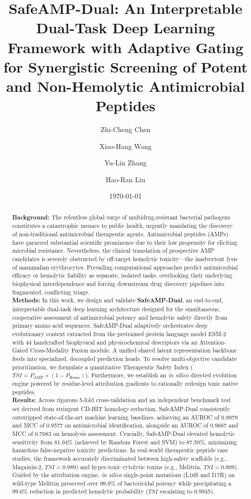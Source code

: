 \documentclass[11pt,a4paper]{article}
\title{\textbf{SafeAMP-Dual: An Interpretable Dual-Task Deep Learning Framework with Adaptive Gating for Synergistic Screening of Potent and Non-Hemolytic Antimicrobial Peptides}}
\author[1]{Zhi-Cheng Chen}
\author[1]{Xiao-Hang Wang}
\author[2]{Yu-Lin Zhang}
\author[1,*]{Hao-Ran Liu}
\affil[1]{Department of Biomedical Engineering, School of Life Sciences, National Center for Computational Biology, Wuhan, 430072, China}
\affil[2]{Institute of Clinical Pharmacology, State Key Laboratory of Biotherapy, West China Hospital, Sichuan University, Chengdu, 610041, China}
\affil[*]{Corresponding author. Email: liu.haoran@computbiol.ac.cn}
\date{\today}
\begin{document}
\maketitle

\begin{abstract}
\textbf{Background:} The relentless global surge of multidrug-resistant bacterial pathogens constitutes a catastrophic menace to public health, urgently mandating the discovery of non-traditional antimicrobial therapeutic agents. Antimicrobial peptides (AMPs) have garnered substantial scientific prominence due to their low propensity for eliciting microbial resistance. Nevertheless, the clinical translation of prospective AMP candidates is severely obstructed by off-target hemolytic toxicity---the inadvertent lysis of mammalian erythrocytes. Prevailing computational approaches predict antimicrobial efficacy or hemolytic liability as separate, isolated tasks, overlooking their underlying biophysical interdependence and forcing downstream drug discovery pipelines into fragmented, conflicting triage. \\
\textbf{Methods:} In this work, we design and validate \textbf{SafeAMP-Dual}, an end-to-end, interpretable dual-task deep learning architecture designed for the simultaneous, cooperative assessment of antimicrobial potency and hemolytic safety directly from primary amino acid sequences. SafeAMP-Dual adaptively orchestrates deep evolutionary context extracted from the pretrained protein language model ESM-2 with 44 handcrafted biophysical and physicochemical descriptors via an Attention-Gated Cross-Modality Fusion module. A unified shared latent representation backbone feeds into specialized, decoupled prediction heads. To resolve multi-objective candidate prioritization, we formulate a quantitative Therapeutic Safety Index ($TSI = P_{\text{AMP}} \times (1 - P_{\text{Hemo}})$). Furthermore, we establish an \textit{in silico} directed evolution engine powered by residue-level attribution gradients to rationally redesign toxic native peptides. \\
\textbf{Results:} Across rigorous 5-fold cross-validation and an independent benchmark test set derived from stringent CD-HIT homology-reduction, SafeAMP-Dual consistently outstripped state-of-the-art machine learning baselines, achieving an AUROC of 0.9979 and MCC of 0.9577 on antimicrobial identification, alongside an AUROC of 0.9667 and MCC of 0.7683 on hemolysis assessment. Crucially, SafeAMP-Dual elevated hemolytic sensitivity from 81.94\% (achieved by Random Forest and SVM) to 87.50\%, minimizing hazardous false-negative toxicity predictions. In real-world therapeutic peptide case studies, the framework accurately discriminated between high-safety scaffolds (e.g., Magainin-2, $TSI=0.989$) and hyper-toxic cytolytic toxins (e.g., Melittin, $TSI=0.009$). Guided by the attribution engine, \textit{in silico} single-point mutations (L16S and I17R) on wild-type Melittin preserved over 99.9\% of bactericidal potency while precipitating a 99.6\% reduction in predicted hemolytic probability ($TSI$ escalating to 0.9945). \\

\end{abstract}
\end{document}
